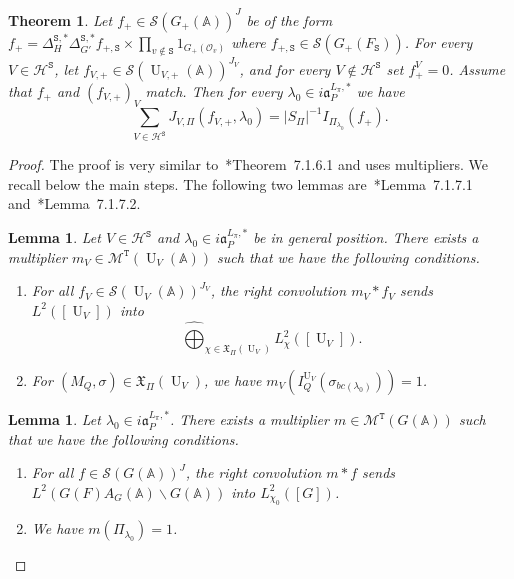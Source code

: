 \documentclass[letterpaper,11pt]{amsart}
\newcommand{\fa}{\mathfrak{a}}
\newcommand{\fX}{\mathfrak{X}}
\newcommand{\bA}{\mathbb{A}}
\newcommand{\cH}{\mathcal{H}}
\newcommand{\cM}{\mathcal{M}}
\newcommand{\cO}{\mathcal{O}}
\newcommand{\cS}{\mathcal{S}}
\newcommand{\tS}{\mathtt{S}}
\newcommand{\tT}{\mathtt{T}}
\newcommand{\<}{\negthickspace}
\DeclareMathOperator{\U}{U}
\theoremstyle{definition}
\theoremstyle{plain}
\newtheorem{theorem}[definition]{Theorem}
\newtheorem{lemma}[definition]{Lemma}
\theoremstyle{remark}
\numberwithin{equation}{section}
\begin{document}
\begin{theorem}
\label{thm:global_identity}
    Let $f_+ \in \cS(G_+(\bA))^J$ be of the form $f_+ = \Delta_H^{\tS,*} \Delta_{G'}^{\tS,*} f_{+,\tS} \times \prod_{v \notin \tS} 1_{G_+(\cO_v)}$ where $f_{+,\tS} \in \cS(G_+(F_\tS))$. For every $V \in \cH^\tS$, let $f_{V,+} \in \cS(\U_{V,+}(\bA))^{J_{V}}$, and for every $V \notin \cH^\tS$ set $f_+^V=0$. Assume that $f_+$ and $(f_{V,+})_V$ match. Then for every $\lambda_0 \in i \fa^{L_\pi,*}_{P}$ we have
    \begin{equation}
    \label{eq:global_identity}
        \sum_{V \in \cH^\tS} J_{V,\Pi}(f_{V,+},\lambda_0) = |S_\Pi|^{-1} I_{\Pi_{\lambda_0}}(f_+).
    \end{equation}
\end{theorem}

\begin{proof}
    The proof is very similar to~\cite{BPC22}*{Theorem~7.1.6.1} and uses multipliers. We recall below the main steps. The following two lemmas are~\cite{BPC22}*{Lemma~7.1.7.1} and~\cite{BPC22}*{Lemma~7.1.7.2}.

    \begin{lemma}
    \label{lem:existence_mult_gln}
        Let $V \in \cH^\tS$ and $\lambda_0 \in i \fa_{P}^{L_\pi,*}$ be in general position. There exists a multiplier $m_V \in \cM^{\tT}(\U_V(\bA))$ such that we have the following conditions.
        \begin{enumerate}
            \item For all $f_V \in \cS(\U_V(\bA))^{J_V}$, the
                right convolution $m_V*f_V$ sends $L^2([\U_V])$ into
            \begin{equation*}
                \widehat{\bigoplus}_{\chi \in \fX_\Pi(\U_V)} L^2_\chi([\U_V]).
            \end{equation*}
            \item For $(M_{Q},\sigma) \in \fX_\Pi(\U_V)$, we have
                $m_V(I_{Q}^{\U_V} (\sigma_{bc(\lambda_0)}))=1$.
        \end{enumerate}
    \end{lemma}

     \begin{lemma}
         \label{lem:existence_mult_unitary}
        Let $\lambda_0 \in i \fa_{P}^{L_\pi,*}$. There exists a multiplier $m \in \cM^{\tT}(G(\bA))$ such that we have the following conditions.
        \begin{enumerate}
            \item For all $f \in \cS(G(\bA))^{J}$, the right
                convolution $m*f$ sends $L^2(G(F) A_G(\bA) \backslash
                G(\bA))$ into $L^2_{\chi_0}([G])$.
            \item We have $m(\Pi_{\lambda_0})=1$.
        \end{enumerate}
    \end{lemma}


\end{proof}
\end{document}
